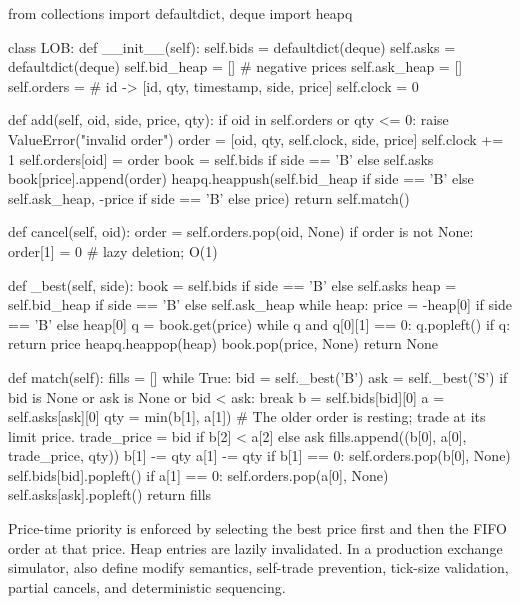 \documentclass[11pt,letterpaper,openany]{book}
\begin{document}
\begin{codeblock}
from collections import defaultdict, deque
import heapq

class LOB:
    def __init__(self):
        self.bids = defaultdict(deque)
        self.asks = defaultdict(deque)
        self.bid_heap = []          # negative prices
        self.ask_heap = []
        self.orders = {}            # id -> [id, qty, timestamp, side, price]
        self.clock = 0

    def add(self, oid, side, price, qty):
        if oid in self.orders or qty <= 0:
            raise ValueError("invalid order")
        order = [oid, qty, self.clock, side, price]
        self.clock += 1
        self.orders[oid] = order
        book = self.bids if side == 'B' else self.asks
        book[price].append(order)
        heapq.heappush(self.bid_heap if side == 'B' else self.ask_heap,
                       -price if side == 'B' else price)
        return self.match()

    def cancel(self, oid):
        order = self.orders.pop(oid, None)
        if order is not None:
            order[1] = 0            # lazy deletion; O(1)

    def _best(self, side):
        book = self.bids if side == 'B' else self.asks
        heap = self.bid_heap if side == 'B' else self.ask_heap
        while heap:
            price = -heap[0] if side == 'B' else heap[0]
            q = book.get(price)
            while q and q[0][1] == 0:
                q.popleft()
            if q:
                return price
            heapq.heappop(heap)
            book.pop(price, None)
        return None

    def match(self):
        fills = []
        while True:
            bid = self._best('B')
            ask = self._best('S')
            if bid is None or ask is None or bid < ask:
                break
            b = self.bids[bid][0]
            a = self.asks[ask][0]
            qty = min(b[1], a[1])
            # The older order is resting; trade at its limit price.
            trade_price = bid if b[2] < a[2] else ask
            fills.append((b[0], a[0], trade_price, qty))
            b[1] -= qty
            a[1] -= qty
            if b[1] == 0:
                self.orders.pop(b[0], None)
                self.bids[bid].popleft()
            if a[1] == 0:
                self.orders.pop(a[0], None)
                self.asks[ask].popleft()
        return fills
\end{codeblock}

Price-time priority is enforced by selecting the best price first and then the FIFO order at that price. Heap entries are lazily invalidated. In a production exchange simulator, also define modify semantics, self-trade prevention, tick-size validation, partial cancels, and deterministic sequencing.
\end{document}
